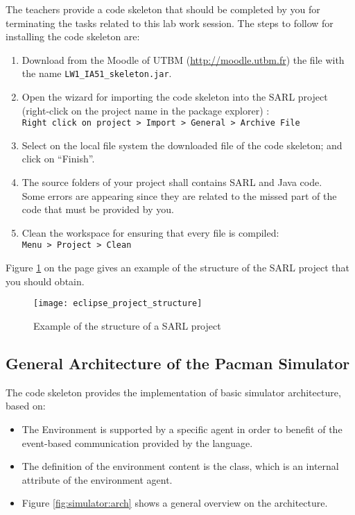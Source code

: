 \documentclass[article,english,nodocumentinfo]{utbmciadreport}
\gdef\skeletonName{\texttt{\mbox{LW1\_IA51\_skeleton\string.jar}}}
\begin{document}
The teachers provide a code skeleton that should be completed by you for terminating the tasks related to this lab work session.
The steps to follow for installing the code skeleton are:
\begin{enumerate}
\item Download from the Moodle of UTBM (\url{http://moodle.utbm.fr}) the file with the name \skeletonName.
\item Open the wizard for importing the code skeleton into the SARL project (right-click on the project name in the package explorer)	: \\
	\texttt{Right click on project > Import > General > Archive File}
\item Select on the local file system the downloaded file of the code skeleton; and click on ``Finish''.
\item The source folders of your project shall contains SARL and Java code. \\
	Some errors are appearing since they are related to the missed part of the code that must be provided by you. 
\item Clean the workspace for ensuring that every file is compiled: \\
	\texttt{Menu > Project > Clean}
\end{enumerate}

Figure \ref{fig:eclipse_project_structure} on the page \pageref{fig:eclipse_project_structure} gives an example of the structure of the SARL project that you should obtain.

\begin{figure}[p]
	\centering
	\texttt{[image: eclipse\_project\_structure]}
	\caption{Example of the structure of a SARL project}
	\label{fig:eclipse_project_structure}
\end{figure}

\subsection{General Architecture of the Pacman Simulator}

The code skeleton provides the implementation of basic simulator architecture, based on:
\begin{itemize}
\item The Environment is supported by a specific agent in order to benefit of the event-based communication provided by the \sarl language.
\item The definition of the environment content is the  class, which is an internal attribute of the environment agent.
\item Figure \ref{fig:simulator:arch} shows a general overview on the architecture.
\end{itemize}
\end{document}
